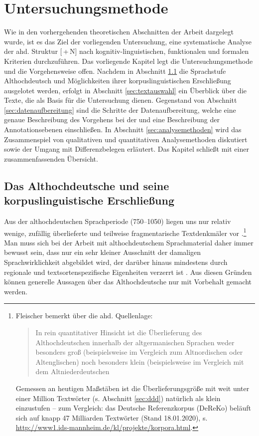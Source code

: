\chapter{Untersuchungsmethode}\label{methode}

Wie in den vorhergehenden theoretischen Abschnitten der Arbeit dargelegt wurde, ist es das Ziel der vorliegenden Untersuchung, eine systematische Analyse der ahd. Struktur [\,+\,N] nach  kognitiv-linguistischen, funktionalen und formalen Kriterien durchzuführen. Das vorliegende Kapitel legt die Untersuchungsmethode und die Vorgehensweise offen. Nachdem in Abschnitt \ref{sec:ahd} die Sprachstufe Althochdeutsch und Möglichkeiten ihrer korpuslinguistischen   Erschließung ausgelotet werden, erfolgt in Abschnitt \ref{sec:textauswahl} ein Überblick über die Texte, die als Basis für die Untersuchung dienen. Gegenstand von Abschnitt \ref{sec:datenaufbereitung} sind die Schritte der Datenaufbereitung, welche eine genaue Beschreibung des Vorgehens bei der  und eine Beschreibung der Annotationsebenen  einschließen. In Abschnitt \ref{sec:analysemethoden} wird das Zusammenspiel von qualitativen und quantitativen Analysemethoden diskutiert sowie der Umgang mit Differenzbelegen  erläutert. Das Kapitel schließt mit einer zusammenfassenden Übersicht. 

\section{Das Althochdeutsche und seine korpuslinguistische Erschließung}\label{sec:ahd}\largerpage

Aus der althochdeutschen Sprachperiode (750--1050) liegen uns nur relativ wenige, zufällig überlieferte und teilweise fragmentarische Textdenkmäler vor \parencite[zur Überlieferungsproblematik s. ausführlich][49--105]{Sonderegger2003}.\footnote{Fleischer bemerkt über die ahd. Quellenlage: \blockcquote[27]{Fleischer2006}{In rein quantitativer Hinsicht ist die Überlieferung des Althochdeutschen innerhalb der altgermanischen Sprachen weder besonders groß (beispielsweise im Vergleich zum Altnordischen oder Altenglischen) noch besonders  klein (beispielsweise im Vergleich mit dem Altniederdeutschen}. Gemessen an heutigen Maßstäben ist die Überlieferungsgröße mit weit unter einer Million Textwörter (s. Abschnitt \ref{sec:ddd}) natürlich als klein einzustufen -- zum Vergleich: das Deutsche Referenzkorpus  (DeReKo) beläuft sich auf knapp 47 Milliarden Textwörter (Stand 18.01.2020), s. \url{http://www1.ids-mannheim.de/kl/projekte/korpora.html}.} Man muss sich bei der Arbeit mit althochdeutschem Sprachmaterial daher immer bewusst sein, dass  nur ein sehr kleiner Ausschnitt der damaligen Sprachwirklichkeit abgebildet wird, der darüber hinaus mindestens durch regionale und textsortenspezifische Eigenheiten verzerrt ist  \parencite[27--31]{Fleischer2006}. Aus diesen Gründen können generelle Aussagen über das Althochdeutsche nur mit Vorbehalt gemacht werden. 

